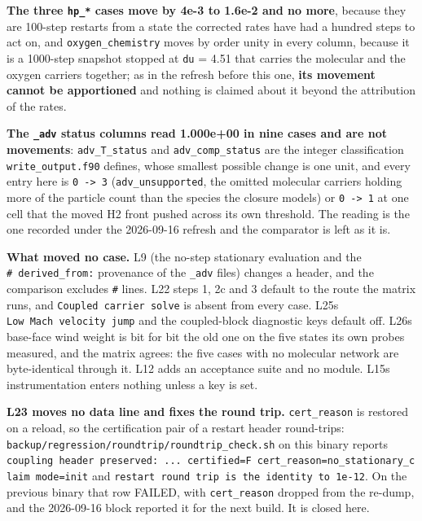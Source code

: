 \documentclass[english,a4paper]{my_memo}
\begin{document}
\textbf{The three \texttt{hp\_*} cases move by 4e-3 to 1.6e-2 and no more}, because they are
100-step restarts from a state the corrected rates have had a hundred steps to
act on, and \texttt{oxygen\_chemistry} moves by order unity in every column, because it
is a 1000-step snapshot stopped at \texttt{du} = 4.51 that carries the molecular and
the oxygen carriers together; as in the refresh before this one, \textbf{its movement
cannot be apportioned} and nothing is claimed about it beyond the attribution
of the rates.

\textbf{The \texttt{\_adv} status columns read 1.000e+00 in nine cases and are not
movements}: \texttt{adv\_T\_status} and \texttt{adv\_comp\_status} are the integer
classification \texttt{write\_output.f90} defines, whose smallest possible change is
one unit, and every entry here is \texttt{0\ -\textgreater{}\ 3} (\texttt{adv\_unsupported}, the omitted
molecular carriers holding more of the particle count than the species the
closure models) or \texttt{0\ -\textgreater{}\ 1} at one cell that the moved H2 front pushed across
its own threshold. The reading is the one recorded under the 2026-09-16
refresh and the comparator is left as it is.

\textbf{What moved no case.} L9 (the no-step stationary evaluation and the
\texttt{\#\ derived\_from:} provenance of the \texttt{\_adv} files) changes a header, and the
comparison excludes \texttt{\#} lines. L22 steps 1, 2c and 3 default to the route the
matrix runs, and \texttt{Coupled\ carrier\ solve} is absent from every case. L25\textquotesingle s
\texttt{Low\ Mach\ velocity\ jump} and the coupled-block diagnostic keys default off.
L26\textquotesingle s base-face wind weight is bit for bit the old one on the five states its
own probes measured, and the matrix agrees: the five cases with no molecular
network are byte-identical through it. L12 adds an acceptance suite and no
module. L15\textquotesingle s instrumentation enters nothing unless a key is set.

\textbf{L23 moves no data line and fixes the round trip.} \texttt{cert\_reason} is restored
on a reload, so the certification pair of a restart header round-trips:
\texttt{backup/regression/roundtrip/roundtrip\_check.sh} on this binary reports
\texttt{coupling\ header\ preserved:\ ...\ certified=F\ cert\_reason=no\_stationary\_claim\ mode=init} and \texttt{restart\ round\ trip\ is\ the\ identity\ to\ 1e-12}. On the previous
binary that row FAILED, with \texttt{cert\_reason} dropped from the re-dump, and the
2026-09-16 block reported it for the next build. It is closed here.
\end{document}
